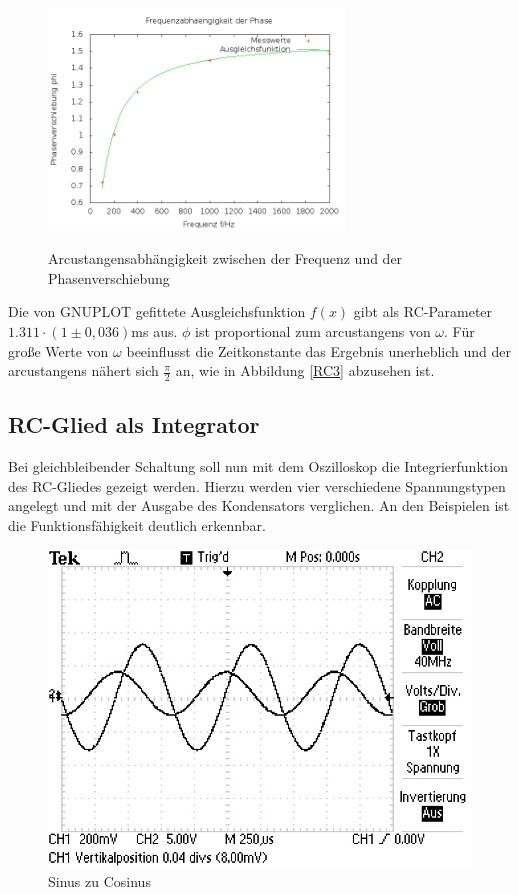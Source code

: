 \begin{figure}[H]
\includegraphics[width=0.7\textwidth] {_pics/RC3.png}
\centering
\label{RC3}
\caption{Arcustangensabhängigkeit zwischen der Frequenz und der Phasenverschiebung}
\end{figure}

Die von GNUPLOT gefittete Ausgleichsfunktion $f(x)$ gibt als RC-Parameter $1.311\cdot(1\pm0,036)$ms aus. $\phi$ ist proportional 
zum arcustangens von $\omega$. Für große Werte von $\omega$ beeinflusst die Zeitkonstante das Ergebnis unerheblich und der 
arcustangens nähert sich $\frac{\pi}{2}$ an, wie in Abbildung \eqref{RC3} abzusehen ist.

\subsection{RC-Glied als Integrator}
Bei gleichbleibender Schaltung soll nun mit dem Oszilloskop die Integrierfunktion des RC-Gliedes gezeigt werden. 
Hierzu werden vier verschiedene Spannungstypen angelegt und mit der Ausgabe des Kondensators verglichen. An den
Beispielen ist die Funktionsfähigkeit deutlich erkennbar.

\begin{figure}[H]
\includegraphics[height=0.4\textheight] {_pics/sinus.JPG}
\centering
\caption{Sinus zu Cosinus}
\end{figure}

